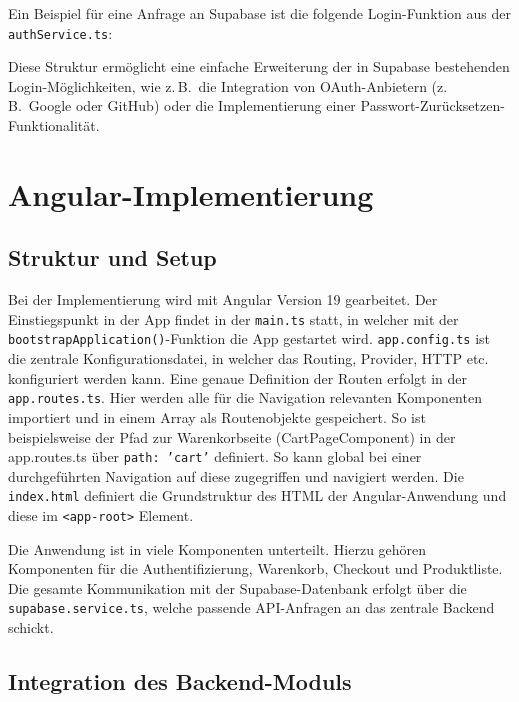 \documentclass[oneside]{ausarbeitung}
\begin{document}
Ein Beispiel für eine Anfrage an Supabase ist die folgende Login-Funktion aus der \texttt{authService.ts}:



Diese Struktur ermöglicht eine einfache Erweiterung der in Supabase bestehenden Login-Möglichkeiten, wie z.\,B.\ die Integration von OAuth-Anbietern (z.\,B.\ Google oder GitHub) oder die Implementierung einer Passwort-Zurücksetzen-Funktionalität.

\section{Angular-Implementierung}
\subsection{Struktur und Setup}

Bei der Implementierung wird mit Angular Version 19 gearbeitet. Der Einstiegspunkt in der App findet in der \texttt{main.ts} statt, in welcher mit der \texttt{bootstrapApplication()}-Funktion die App gestartet wird. \texttt{app.config.ts} ist die zentrale Konfigurationsdatei, in welcher das Routing, Provider, HTTP etc. konfiguriert werden kann. Eine genaue Definition der Routen erfolgt in der \texttt{app.routes.ts}. Hier werden alle für die Navigation relevanten Komponenten importiert und in einem Array als Routenobjekte gespeichert. So ist beispielsweise der Pfad zur Warenkorbseite (CartPageComponent) in der app.routes.ts über \texttt{path: 'cart'} definiert. So kann global bei einer durchgeführten Navigation auf diese zugegriffen und navigiert werden. Die \texttt{index.html} definiert die Grundstruktur des HTML der Angular-Anwendung und diese im \texttt{<app-root>} Element.

Die Anwendung ist in viele Komponenten unterteilt. Hierzu gehören Komponenten für die Authentifizierung, Warenkorb, Checkout und Produktliste. Die gesamte Kommunikation mit der Supabase-Datenbank erfolgt über die \texttt{supabase.service.ts}, welche passende API-Anfragen an das zentrale Backend schickt.

\subsection{Integration des Backend-Moduls}
\end{document}
